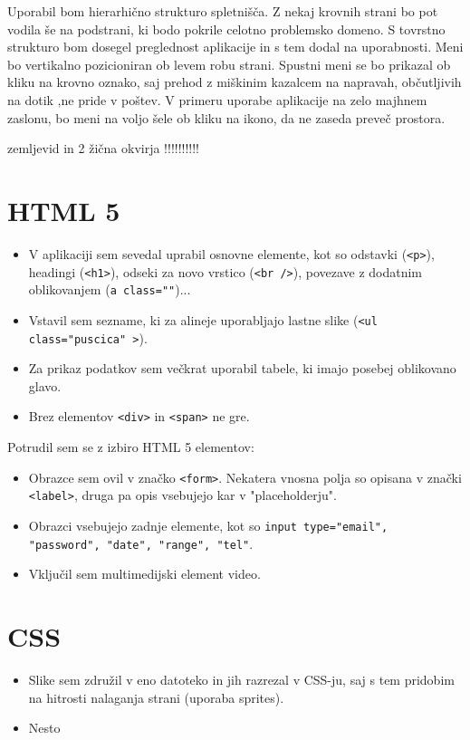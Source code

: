 \documentclass[a4paper,11pt]{article}
\begin{document}
Uporabil bom hierarhično strukturo spletnišča. Z nekaj krovnih strani bo pot vodila še na podstrani, ki bodo pokrile celotno problemsko domeno. S tovrstno strukturo bom dosegel preglednost aplikacije in s tem dodal na uporabnosti.\newpage
Meni bo vertikalno pozicioniran ob levem robu strani. Spustni meni se bo prikazal ob kliku na krovno oznako, saj prehod z miškinim kazalcem na napravah, občutljivih na dotik ,ne pride v poštev. V primeru uporabe aplikacije na zelo majhnem zaslonu, bo meni na voljo šele ob kliku na ikono, da ne zaseda preveč prostora.

zemljevid in 2 žična okvirja !!!!!!!!!!

\section{HTML 5}

\begin{itemize}
\item V aplikaciji sem sevedal uprabil osnovne elemente, kot so odstavki (\texttt{<p>}), headingi (\texttt{<h1>}), odseki za novo vrstico (\texttt{<br />}), povezave z dodatnim oblikovanjem (\texttt{a class=""})...
\item Vstavil sem sezname, ki za alineje uporabljajo lastne slike (\texttt{<ul class="puscica" >}).
\item Za prikaz podatkov sem večkrat uporabil tabele, ki imajo posebej oblikovano glavo.
\item Brez elementov \texttt{<div>} in \texttt{<span>} ne gre.
\end{itemize}

Potrudil sem se z izbiro HTML 5 elementov:
\begin{itemize}
\item Obrazce sem ovil v značko \texttt{<form>}. Nekatera vnosna polja so opisana v znački \texttt{<label>}, druga pa opis vsebujejo kar v "placeholderju".
\item Obrazci vsebujejo zadnje elemente, kot so \texttt{input type="email", "password", "date", "range", "tel"}.
\item Vključil sem multimedijski element video.
\end{itemize}

\section{CSS}

\begin{itemize}
\item Slike sem združil v eno datoteko in jih razrezal v CSS-ju, saj s tem pridobim na hitrosti nalaganja strani (uporaba sprites).
\item Nesto
\end{itemize}
\end{document}
